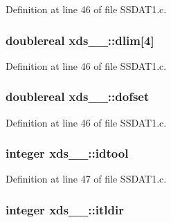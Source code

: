 Definition at line 46 of file S\+S\+D\+A\+T1.\+c.

\subsubsection[{\texorpdfstring{dlim}{dlim}}]{\setlength{\rightskip}{0pt plus 5cm}doublereal xds\+\_\+\_\+\+::dlim\mbox{[}4\mbox{]}}\hypertarget{structxds__1___ab1e455b4519b80b68b4ee3cb1a66737e}{}\label{structxds__1___ab1e455b4519b80b68b4ee3cb1a66737e}


Definition at line 46 of file S\+S\+D\+A\+T1.\+c.

\subsubsection[{\texorpdfstring{dofset}{dofset}}]{\setlength{\rightskip}{0pt plus 5cm}doublereal xds\+\_\+\_\+\+::dofset}\hypertarget{structxds__1___a8bae1632a1ed8e3cc0b0894c9abf5c0a}{}\label{structxds__1___a8bae1632a1ed8e3cc0b0894c9abf5c0a}


Definition at line 46 of file S\+S\+D\+A\+T1.\+c.

\subsubsection[{\texorpdfstring{idtool}{idtool}}]{\setlength{\rightskip}{0pt plus 5cm}integer xds\+\_\+\_\+\+::idtool}\hypertarget{structxds__1___a2ad5e433cfd6f2dbd17bc06a709a5cd6}{}\label{structxds__1___a2ad5e433cfd6f2dbd17bc06a709a5cd6}


Definition at line 47 of file S\+S\+D\+A\+T1.\+c.

\subsubsection[{\texorpdfstring{itldir}{itldir}}]{\setlength{\rightskip}{0pt plus 5cm}integer xds\+\_\+\_\+\+::itldir}\hypertarget{structxds__1___a3b6b60305ab915c9b00fad7da4b15a81}{}\label{structxds__1___a3b6b60305ab915c9b00fad7da4b15a81}


